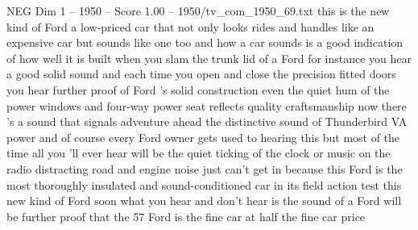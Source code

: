 \begin{textsample}{NEG Dim 1 – 1950 – Score 1.00 – 1950/tv\_com\_1950\_69.txt}  \label{ex:f1_neg_083}
this is the new kind of Ford a low-priced car that not only looks rides and handles like an expensive car but sounds like one too and how a car sounds is a good indication of how well it is built when you slam the trunk lid of a Ford for instance you hear a good solid sound and each time you open and close the precision fitted doors you hear further proof of Ford 's solid construction even the quiet hum of the power windows and four-way power seat reflects quality craftsmanship now there 's a sound that signals adventure ahead the distinctive sound of Thunderbird VA power and of course every Ford owner gets used to hearing this but most of the time all you 'll ever hear will be the quiet ticking of the clock or music on the radio distracting road and engine noise just can't get in because this Ford is the most thoroughly insulated and sound-conditioned car in its field action test this new kind of Ford soon what you hear and don't hear is the sound of a Ford will be further proof that the 57 Ford is the fine car at half the fine car price

\end{textsample}
